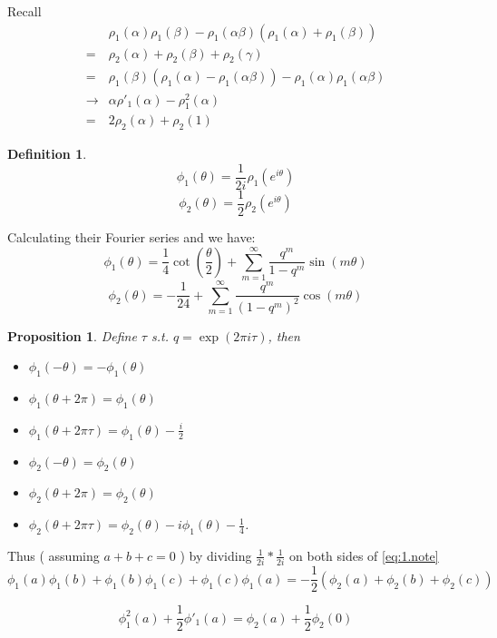\documentclass{article}
\newtheorem{Prop}[Thm]{Proposition}
\newtheorem{Def}{Definition}[section]
\begin{document}
Recall
\begin{align*}
  &\rho_1(\alpha)\rho_1(\beta) - \rho_1(\alpha\beta)(\rho_1(\alpha)+ \rho_1(\beta)) \\
  =& \rho_2(\alpha)+\rho_2(\beta)+\rho_2(\gamma)\\
  =& \rho_1(\beta)(\rho_1(\alpha)-\rho_1(\alpha\beta)) - \rho_1(\alpha)\rho_1(\alpha\beta)\\
  \to& \alpha\rho'_1(\alpha)- \rho_1^2(\alpha)\\
  =& 2\rho_2(\alpha)+\rho_2(1)
\end{align*}

\begin{Def}
 \[\phi_1(\theta)= \frac{1}{2i}\rho_1(e^{i\theta})\]
 \[\phi_2(\theta) = \frac{1}{2}\rho_2(e^{i\theta})\]
\end{Def}
Calculating their Fourier series and we have:
\[\phi_1(\theta)= \frac{1}{4}\cot(\frac{\theta}{2}) + \sum\limits_{m=1}^{\infty} \frac{q^m}{1-q^m} \sin(m\theta)\]
\[\phi_2(\theta) = -\frac{1}{24} + \sum\limits_{m=1}^{\infty} \frac{q^m}{(1-q^m)^2}\cos(m\theta)\]

\begin{Prop}
 Define $\tau$ s.t. $q=\exp(2\pi i \tau)$, then

\begin{itemize}
\item $\phi_1(-\theta)= - \phi_1(\theta)$
\item $\phi_1(\theta+2\pi)= \phi_1(\theta)$ 
\item $\phi_1(\theta+2\pi\tau)=\phi_1(\theta)-\frac{i}{2}$ 
\item $\phi_2(-\theta)=\phi_2(\theta)$
\item $\phi_2(\theta+2\pi)=\phi_2(\theta)$
\item $\phi_2(\theta+2\pi\tau)=\phi_2(\theta)-i\phi_1(\theta)-\frac{1}{4}$.
\end{itemize}
\end{Prop}

Thus ( assuming $a+b+c=0$ ) by dividing $\frac{1}{2i}* \frac{1}{2i}$ on both sides of \ref{eq:1.note}
\begin{equation}
 \label{eq1.1}
 \phi_1(a)\phi_{1}(b)+\phi_1(b)\phi_1(c)+\phi_1(c)\phi_1(a)=-\frac{1}{2} \left( \phi_2(a)+ \phi_2(b) + \phi_2(c) \right)
\end{equation}

\begin{equation}
 \label{eq1.2}
\phi_1^2(a) + \frac{1}{2}\phi'_1(a)= \phi_2(a) + \frac{1}{2}\phi_2(0)
\end{equation}
\end{document}
